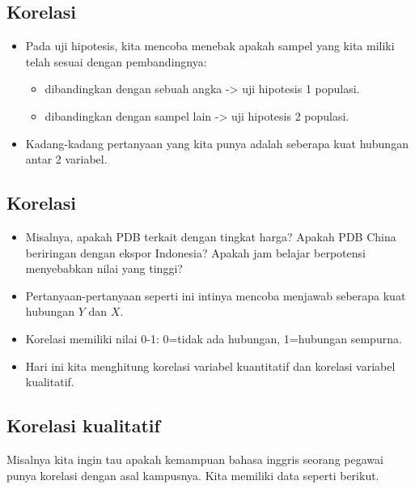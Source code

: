 \documentclass[
  letterpaper,
  DIV=11,
  numbers=noendperiod]{scrartcl}
\begin{document}
\hypertarget{korelasi}{%
\subsection{Korelasi}\label{korelasi}}

\begin{itemize}
\item
  Pada uji hipotesis, kita mencoba menebak apakah sampel yang kita
  miliki telah sesuai dengan pembandingnya:

  \begin{itemize}
  \item
    dibandingkan dengan sebuah angka -\textgreater{} uji hipotesis 1
    populasi.
  \item
    dibandingkan dengan sampel lain -\textgreater{} uji hipotesis 2
    populasi.
  \end{itemize}
\item
  Kadang-kadang pertanyaan yang kita punya adalah seberapa kuat hubungan
  antar 2 variabel.
\end{itemize}

\hypertarget{korelasi-1}{%
\subsection{Korelasi}\label{korelasi-1}}

\begin{itemize}
\item
  Misalnya, apakah PDB terkait dengan tingkat harga? Apakah PDB China
  beriringan dengan ekspor Indonesia? Apakah jam belajar berpotensi
  menyebabkan nilai yang tinggi?
\item
  Pertanyaan-pertanyaan seperti ini intinya mencoba menjawab seberapa
  kuat hubungan \(Y\) dan \(X\).
\item
  Korelasi memiliki nilai 0-1: 0=tidak ada hubungan, 1=hubungan
  sempurna.
\item
  Hari ini kita menghitung korelasi variabel kuantitatif dan korelasi
  variabel kualitatif.
\end{itemize}

\hypertarget{korelasi-kualitatif}{%
\subsection{Korelasi kualitatif}\label{korelasi-kualitatif}}

Misalnya kita ingin tau apakah kemampuan bahasa inggris seorang pegawai
punya korelasi dengan asal kampusnya. Kita memiliki data seperti
berikut.
\end{document}
